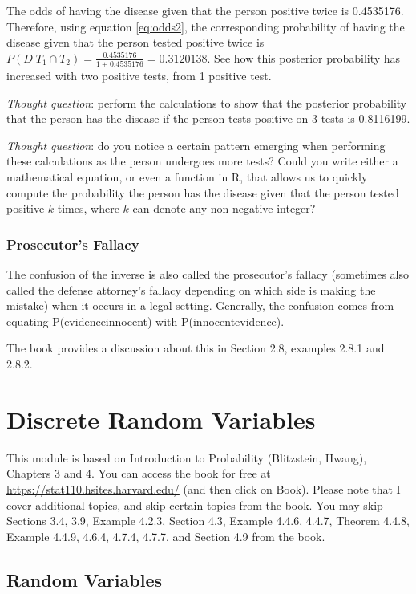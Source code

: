 \documentclass[
]{book}
\begin{document}
The odds of having the disease given that the person positive twice is 0.4535176. Therefore, using equation \eqref{eq:odds2}, the corresponding probability of having the disease given that the person tested positive twice is \(P(D|T_1 \cap T_2) = \frac{0.4535176}{1+0.4535176} = 0.3120138\). See how this posterior probability has increased with two positive tests, from 1 positive test.

\emph{Thought question}: perform the calculations to show that the posterior probability that the person has the disease if the person tests positive on 3 tests is 0.8116199.

\emph{Thought question}: do you notice a certain pattern emerging when performing these calculations as the person undergoes more tests? Could you write either a mathematical equation, or even a function in R, that allows us to quickly compute the probability the person has the disease given that the person tested positive \(k\) times, where \(k\) can denote any non negative integer?

\subsection{Prosecutor's Fallacy}\label{prosecutors-fallacy}

The confusion of the inverse is also called the prosecutor's fallacy (sometimes also called the defense attorney's fallacy depending on which side is making the mistake) when it occurs in a legal setting. Generally, the confusion comes from equating P(evidence\textbar innocent) with P(innocent\textbar evidence).

The book provides a discussion about this in Section 2.8, examples 2.8.1 and 2.8.2.

\chapter{Discrete Random Variables}\label{discrete-random-variables}

This module is based on Introduction to Probability (Blitzstein, Hwang), Chapters 3 and 4. You can access the book for free at \url{https://stat110.hsites.harvard.edu/} (and then click on Book). Please note that I cover additional topics, and skip certain topics from the book. You may skip Sections 3.4, 3.9, Example 4.2.3, Section 4.3, Example 4.4.6, 4.4.7, Theorem 4.4.8, Example 4.4.9, 4.6.4, 4.7.4, 4.7.7, and Section 4.9 from the book.

\section{Random Variables}\label{random-variables}
\end{document}
